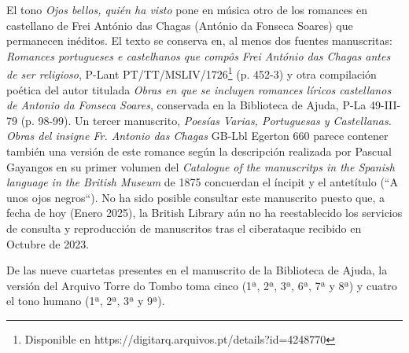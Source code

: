 
El tono \textit{Ojos bellos, quién ha visto} pone en música otro de los romances en castellano de Frei António das Chagas (António da Fonseca Soares) que permanecen inéditos. El texto se conserva en, al menos dos fuentes manuscritas: \textit{Romances portugueses e castelhanos que compôs Frei António das Chagas antes de ser religioso}, P-Lant PT/TT/MSLIV/1726\footnote{\textsuperscript{}Disponible en https://digitarq.arquivos.pt/details?id=4248770} (p. 452-3) y otra compilación poética del autor titulada \textit{Obras en que se incluyen romances líricos castellanos de Antonio da Fonseca Soares}, conservada en la Biblioteca de Ajuda, P-La 49-III-79 (p. 98-99). Un tercer manuscrito, \textit{Poesías Varias, Portuguesas y Castellanas. Obras del insigne Fr. Antonio das Chagas} GB-Lbl Egerton 660 parece contener también una versión de este romance según la descripción realizada por Pascual Gayangos en su primer volumen del \textit{Catalogue of the manuscritps in the Spanish language in the British Museum} de 1875 concuerdan el íncipit y el antetítulo (``A unos ojos negros``). No ha sido posible consultar este manuscrito puesto que, a fecha de hoy (Enero 2025), la British Library aún no ha reestablecido los servicios de consulta y reproducción de manuscritos tras el ciberataque recibido en Octubre de 2023.

De las nueve cuartetas presentes en el manuscrito de la Biblioteca de Ajuda, la versión del Arquivo Torre do Tombo toma cinco (1ª, 2ª, 3ª, 6ª, 7ª y 8ª) y cuatro el tono humano (1ª, 2ª, 3ª y 9ª). 

